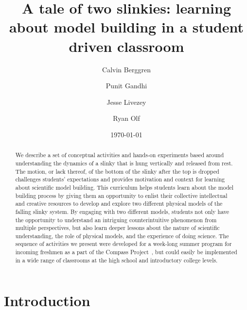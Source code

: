 \documentclass[prb,preprint]{revtex4-1}
\begin{document}
\title{A tale of two slinkies: learning about model building in a student driven classroom }
\author{Calvin Berggren}
\author{Punit  Gandhi}
\author{Jesse Livezey}
\author{Ryan Olf}
\date{\today}

\begin{abstract}

We describe a set of conceptual activities and hands-on experiments based around understanding the dynamics of a slinky that is hung vertically and released from rest.
The motion, or lack thereof, of the bottom of the slinky after the top is dropped challenges students' expectations and provides motivation and context for learning about scientific model building.
This curriculum helps students learn about the model building process by giving them an opportunity to enlist their collective intellectual and creative resources to develop and explore two different physical models of the falling slinky system. By engaging with two different models, students not only have the opportunity to understand an intriguing counterintuitive phenomenon from multiple perspectives, but also learn deeper lessons about the nature of scientific understanding, the role of physical models, and the experience of doing science. 
The sequence of activities we present were developed for a week-long summer program for incoming freshmen as a part of the Compass Project~\cite{albana2013}, but could easily be implemented in a wide range of classrooms at the high school and introductory college levels.
\end{abstract}

\maketitle

\section{Introduction}
\end{document}
